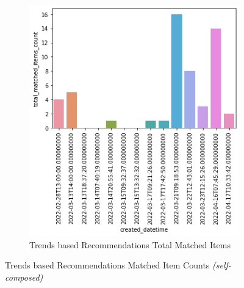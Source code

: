 \documentclass[manuscript,natbib=false]{acmart}
\begin{document}
\begin{figure}[h]
\begin{subfigure}[b]{0.47\linewidth}
        \includegraphics[width=\linewidth]{images/total_matched_items_per_day.png}
        \caption{Trends based Recommendations Total Matched Items}
        \label{fig:trends-recsys-trends-total-matches}
     \end{subfigure}
     \hfill
        \caption{Trends based Recommendations Matched Item Counts \textit{(self-composed)}}
        \label{fig:matches-separated-graphs}
\end{figure}
\end{document}
